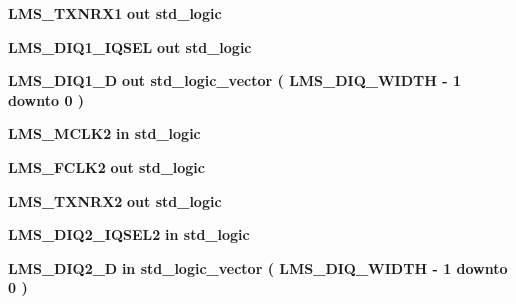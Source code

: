 \begin{DoxyCompactItemize}
\item 
{\bf L\+M\+S\+\_\+\+T\+X\+N\+R\+X1}  {\bfseries {\bfseries \textcolor{keywordflow}{out}\textcolor{vhdlchar}{ }}} {\bfseries \textcolor{comment}{std\+\_\+logic}\textcolor{vhdlchar}{ }} 
\item 
{\bf L\+M\+S\+\_\+\+D\+I\+Q1\+\_\+\+I\+Q\+S\+EL}  {\bfseries {\bfseries \textcolor{keywordflow}{out}\textcolor{vhdlchar}{ }}} {\bfseries \textcolor{comment}{std\+\_\+logic}\textcolor{vhdlchar}{ }} 
\item 
{\bf L\+M\+S\+\_\+\+D\+I\+Q1\+\_\+D}  {\bfseries {\bfseries \textcolor{keywordflow}{out}\textcolor{vhdlchar}{ }}} {\bfseries \textcolor{comment}{std\+\_\+logic\+\_\+vector}\textcolor{vhdlchar}{ }\textcolor{vhdlchar}{(}\textcolor{vhdlchar}{ }\textcolor{vhdlchar}{ }\textcolor{vhdlchar}{ }\textcolor{vhdlchar}{ }{\bfseries {\bf L\+M\+S\+\_\+\+D\+I\+Q\+\_\+\+W\+I\+D\+TH}} \textcolor{vhdlchar}{-\/}\textcolor{vhdlchar}{ } \textcolor{vhdldigit}{1} \textcolor{vhdlchar}{ }\textcolor{keywordflow}{downto}\textcolor{vhdlchar}{ }\textcolor{vhdlchar}{ } \textcolor{vhdldigit}{0} \textcolor{vhdlchar}{ }\textcolor{vhdlchar}{)}\textcolor{vhdlchar}{ }} 
\item 
{\bf L\+M\+S\+\_\+\+M\+C\+L\+K2}  {\bfseries {\bfseries \textcolor{keywordflow}{in}\textcolor{vhdlchar}{ }}} {\bfseries \textcolor{comment}{std\+\_\+logic}\textcolor{vhdlchar}{ }} 
\item 
{\bf L\+M\+S\+\_\+\+F\+C\+L\+K2}  {\bfseries {\bfseries \textcolor{keywordflow}{out}\textcolor{vhdlchar}{ }}} {\bfseries \textcolor{comment}{std\+\_\+logic}\textcolor{vhdlchar}{ }} 
\item 
{\bf L\+M\+S\+\_\+\+T\+X\+N\+R\+X2}  {\bfseries {\bfseries \textcolor{keywordflow}{out}\textcolor{vhdlchar}{ }}} {\bfseries \textcolor{comment}{std\+\_\+logic}\textcolor{vhdlchar}{ }} 
\item 
{\bf L\+M\+S\+\_\+\+D\+I\+Q2\+\_\+\+I\+Q\+S\+E\+L2}  {\bfseries {\bfseries \textcolor{keywordflow}{in}\textcolor{vhdlchar}{ }}} {\bfseries \textcolor{comment}{std\+\_\+logic}\textcolor{vhdlchar}{ }} 
\item 
{\bf L\+M\+S\+\_\+\+D\+I\+Q2\+\_\+D}  {\bfseries {\bfseries \textcolor{keywordflow}{in}\textcolor{vhdlchar}{ }}} {\bfseries \textcolor{comment}{std\+\_\+logic\+\_\+vector}\textcolor{vhdlchar}{ }\textcolor{vhdlchar}{(}\textcolor{vhdlchar}{ }\textcolor{vhdlchar}{ }\textcolor{vhdlchar}{ }\textcolor{vhdlchar}{ }{\bfseries {\bf L\+M\+S\+\_\+\+D\+I\+Q\+\_\+\+W\+I\+D\+TH}} \textcolor{vhdlchar}{-\/}\textcolor{vhdlchar}{ } \textcolor{vhdldigit}{1} \textcolor{vhdlchar}{ }\textcolor{keywordflow}{downto}\textcolor{vhdlchar}{ }\textcolor{vhdlchar}{ } \textcolor{vhdldigit}{0} \textcolor{vhdlchar}{ }\textcolor{vhdlchar}{)}\textcolor{vhdlchar}{ }} 

\end{DoxyCompactItemize}
